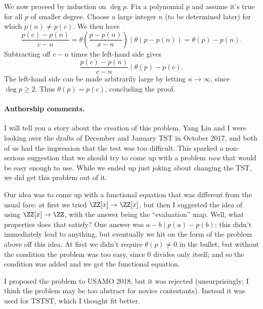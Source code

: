 We now proceed by induction on $\deg p$.
Fix a polynomial $p$ and assume it's true
for all $p$ of smaller degree.
Choose a large integer $n$ (to be determined later)
for which $p(n) \neq p(c)$.
We then have
\[ \frac{p(c)-p(n)}{c-n}
  = \theta\left( \frac{p-p(n)}{x-n} \right)
  \mid \theta\left( p-p(n) \right)
  = \theta(p) - p(n). \]
Subtracting off $c-n$ times the left-hand side gives
\[ \frac{p(c)-p(n)}{c-n}
  \mid \theta(p) - p(c). \]
The left-hand side can be made arbitrarily large
by letting $n \to \infty$, since $\deg p \ge 2$.
Thus $\theta(p) = p(c)$, concluding the proof.

\paragraph{Authorship comments.}
I will tell you a story about the creation of this problem.
Yang Liu and I were looking over the drafts of December and
January TST in October 2017,
and both of us had the impression that the test was too difficult.
This sparked a non-serious suggestion that we should try to
come up with a problem \emph{now} that would be easy enough to use.
While we ended up just joking about changing the TST,
we did get this problem out of it.

Our idea was to come up with a functional equation that
was different from the usual fare:
at first we tried $\ZZ[x] \to \ZZ[x]$,
but then I suggested the idea of using $\ZZ[x] \to \ZZ$,
with the answer being the ``evaluation'' map.
Well, what properties does that satisfy?
One answer was $a-b \mid p(a)-p(b)$;
this didn't immediately lead to anything,
but eventually we hit on the form of the problem above off this idea.
At first we didn't require $\theta(p) \neq 0$ in the bullet,
but without the condition the problem was too easy,
since $0$ divides only itself;
and so the condition was added and we got the functional equation.

I proposed the problem to USAMO 2018, but it was rejected
(unsurprisingly; I think the problem may be
too abstract for novice contestants).
Instead it was used for TSTST, which I thought fit better.
